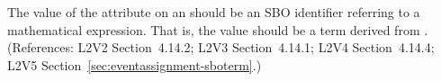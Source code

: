The value of the  attribute on an \EventAssignment should be an
SBO identifier referring to a mathematical expression.  That is, the value
should be a term derived from \sbomathformula.  (References: L2V2 Section~4.14.2;
L2V3 Section~4.14.1; L2V4 Section~4.14.4; L2V5 Section~\ref{sec:eventassignment-sboterm}.)
